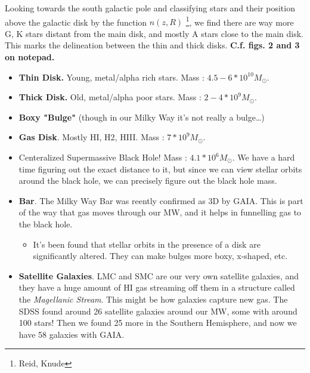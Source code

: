 \documentclass[a4paper]{article}
\begin{document}
\begin{enumerate}
\begin{itemize}
			Looking towards the south galactic pole and classifying stars and their position above the galactic disk by the function $n(z, R)$ \footnote{Reid, Knude}, we find there are way more G, K stars distant from the main disk, and mostly A stars close to the main disk. This marks the delineation between the thin and thick disks. {\bf C.f. figs. 2 and 3 on notepad. }
				\begin{itemize}
					\item {\bf Thin Disk.} Young, metal/alpha rich stars. Mass : $4.5-6*10^{10}M_{\odot}$.
				\item {\bf Thick Disk.} Old, metal/alpha poor stars. Mass : $2-4*10^{9}M_{\odot}$. 
				\item {\bf Boxy "Bulge"} (though in our Milky Way it's not really a bulge\ldots)
				\item {\bf Gas Disk}. Mostly HI, H2, HIII. Mass : $7*10^{9}M_{\odot}$. 
				 \item {\color{violet}C}{\color{cyan}e}{\color{blue}n}{\color{green}t}{\color{yellow}e}{\color{orange}r}{\color{violet}a}{\color{cyan}l}{\color{blue}i}{\color{green}z}{\color{yellow}e}{\color{orange}d}{\color{violet} }{\color{cyan}S}{\color{blue}u}{\color{green}p}{\color{yellow}e}{\color{orange}r}{\color{violet}m}{\color{cyan}a}{\color{blue}s}{\color{green}s}{\color{yellow}i}{\color{orange}v}{\color{violet}e}{\color{cyan} }{\color{blue}B}{\color{green}l}{\color{yellow}a}{\color{orange}c}{\color{violet}k}{\color{cyan} }{\color{blue}H}{\color{green}o}{\color{yellow}l}{\color{orange}e}{\color{violet}}{\color{cyan}!} Mass : $4.1*10^{6}M_{\odot}$. We have a hard time figuring out the exact distance to it, but since we can view stellar orbits around the black hole, we can precisely figure out the black hole mass. 
				 \item {\bf Bar}. The Milky Way Bar was reently confirmed as 3D by GAIA. This is part of the way that gas moves through our MW, and it helps in funnelling gas to the black hole. 
					 \begin{itemize}
					 	\item It's been found that stellar orbits in the presence of a disk are significantly altered. They can make bulges more boxy, x-shaped, etc. 
					 \end{itemize}

				 \item {\bf Satellite Galaxies}. LMC and SMC are our very own satellite galaxies, and they have a huge amount of HI gas streaming off them in a structure called the {\it Magellanic Stream}. This might be how galaxies capture new gas. The SDSS found around 26 satellite galaxies around our MW, some with around 100 stars!
					 Then we found 25 more in the Southern Hemisphere, and now we have 58 galaxies with GAIA. 


\end{itemize}
\end{itemize}
\end{enumerate}
\end{document}
